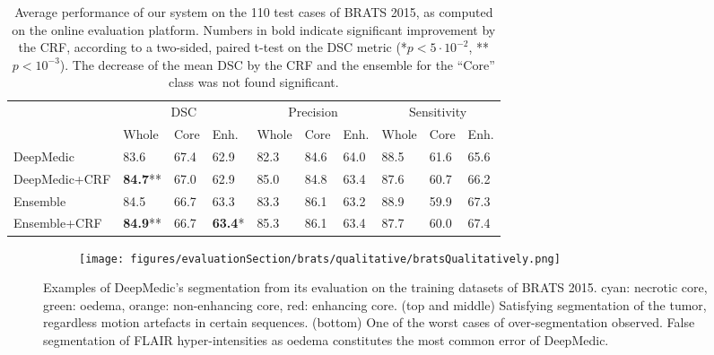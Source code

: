 \documentclass[preprint,authoryear,12pt]{elsarticle}
\newcommand{\quot}[1]{``#1''}
\begin{document}
\begin{table}[!h]
\centering
\scriptsize
\caption{Average performance of our system on the 110 test cases of BRATS 2015, as computed on the online evaluation platform. Numbers in bold indicate significant improvement by the CRF, according to a two-sided, paired t-test on the DSC metric (*$p<5\cdot 10^{-2}$, **$p<10^{-3}$). The decrease of the mean DSC by the CRF and the ensemble for the \quot{Core} class was not found significant.}
\label{table:onlineEvalBrats2015Testing}
\begin{tabular}{@{}llllllllll@{}}
\toprule
              & \multicolumn{3}{c}{DSC}  & \multicolumn{3}{c}{Precision} & \multicolumn{3}{c}{Sensitivity} \\ \cmidrule(l){2-10} 
              & Whole 			& Core & Enh. 			& Whole   & Core   & Enh.	& Whole    & Core   & Enh.   \\ \midrule

DeepMedic     & 83.6  			& 67.4 & 62.9      		& 82.3    & 84.6   & 64.0    & 88.5     & 61.6   & 65.6      \\
DeepMedic+CRF & \textbf{84.7}** 	& 67.0 & 62.9      		& 85.0    & 84.8   & 63.4    & 87.6     & 60.7   & 66.2      \\
Ensemble      & 84.5  			& 66.7 & 63.3      		& 83.3    & 86.1   & 63.2    & 88.9     & 59.9   & 67.3      \\
Ensemble+CRF  & \textbf{84.9}** 	& 66.7 & \textbf{63.4}* 	& 85.3    & 86.1   & 63.4    & 87.7     & 60.0   & 67.4		\\
\bottomrule
\end{tabular}
\end{table}

\begin{figure}[!h]
\centering
\begin{subfigure}[b]{1.0\textwidth}
	\centering
	\texttt{[image: figures/evaluationSection/brats/qualitative/bratsQualitatively.png]}
\end{subfigure}
\vspace{-0pt} \caption{Examples of DeepMedic's segmentation from its evaluation on the training datasets of BRATS 2015. cyan: necrotic core, green: oedema, orange: non-enhancing core, red: enhancing core. (top and middle) Satisfying segmentation of the tumor, regardless motion artefacts in certain sequences. (bottom) One of the worst cases of over-segmentation observed. False segmentation of FLAIR hyper-intensities as oedema constitutes the most common error of DeepMedic.}
\label{fig:evalBratsVisualQuality}
\end{figure}
%
 
\end{document}
